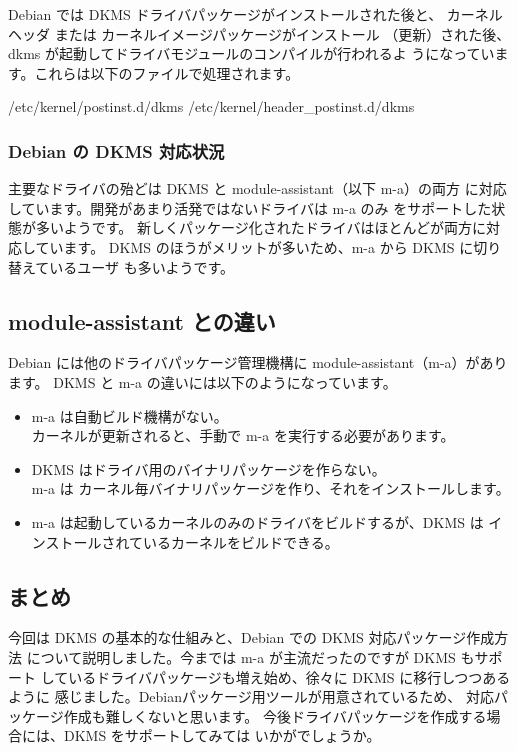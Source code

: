 \documentclass[mingoth,a4paper]{jsarticle}
\begin{document}
Debian では DKMS ドライバパッケージがインストールされた後と、
カーネルヘッダ または カーネルイメージパッケージがインストール
（更新）された後、 dkms が起動してドライバモジュールのコンパイルが行われるよ
うになっています。これらは以下のファイルで処理されます。

\begin{commandline}
/etc/kernel/postinst.d/dkms
/etc/kernel/header_postinst.d/dkms
\end{commandline}

\subsubsection{Debian の DKMS 対応状況}

主要なドライバの殆どは DKMS と module-assistant（以下 m-a）の両方
に対応しています。開発があまり活発ではないドライバは m-a のみ
をサポートした状態が多いようです。
新しくパッケージ化されたドライバはほとんどが両方に対応しています。
DKMS のほうがメリットが多いため、m-a から DKMS に切り替えているユーザ
も多いようです。

\subsection{module-assistant との違い}
Debian には他のドライバパッケージ管理機構に
module-assistant（m-a）があります。
DKMS と m-a の違いには以下のようになっています。
\begin{itemize}
\item m-a は自動ビルド機構がない。\\
カーネルが更新されると、手動で m-a を実行する必要があります。
\item DKMS はドライバ用のバイナリパッケージを作らない。\\
m-a は カーネル毎バイナリパッケージを作り、それをインストールします。
\item m-a は起動しているカーネルのみのドライバをビルドするが、DKMS は
インストールされているカーネルをビルドできる。
\end{itemize}

\subsection{まとめ}

今回は DKMS の基本的な仕組みと、Debian での DKMS 対応パッケージ作成方法
について説明しました。今までは m-a が主流だったのですが DKMS もサポート
しているドライバパッケージも増え始め、徐々に DKMS に移行しつつあるように
感じました。Debianパッケージ用ツールが用意されているため、
対応パッケージ作成も難しくないと思います。
今後ドライバパッケージを作成する場合には、DKMS をサポートしてみては
いかがでしょうか。
\end{document}
